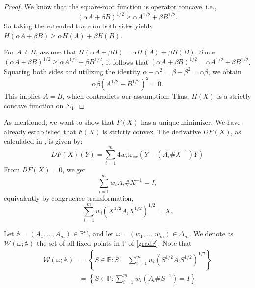 \documentclass[12pt,reqno]{amsart}
\begin{document}
\begin{proof}
We know that the square-root function is operator concave, i.e.,
\begin{displaymath}
(\alpha A + \beta B)^{1/2} \geq \alpha A^{1/2} + \beta B^{1/2}.
\end{displaymath}
So taking the extended trace on both sides yields $H(\alpha A + \beta B) \geq \alpha H(A) + \beta H(B)$.

For $A \neq B$, assume that $H(\alpha A + \beta B) = \alpha H(A) + \beta H(B).$
Since $(\alpha A + \beta B)^{1/2} \geq \alpha A^{1/2} + \beta B^{1/2}$, it follows that $(\alpha A + \beta B)^{1/2} = \alpha A^{1/2} + \beta B^{1/2}$.
Squaring both sides and utilizing the identity $\alpha - \alpha^2 = \beta - \beta^2 = \alpha \beta$, we obtain
\begin{displaymath}
\alpha \beta (A^{1/2} - B^{1/2})^{2} = 0.
\end{displaymath}
This implies $A = B$, which contradicts our assumption. Thus, $H(X)$ is a strictly concave function on $\Sigma_1$.
\end{proof}

As mentioned, we want to show that $F(X)$ has a unique minimizer. We have already established that $F(X)$ is strictly convex. The derivative $DF(X)$, as calculated  in \cite{BJL}, is given by:
\begin{displaymath}
D F(X)(Y) = \sum_{i=1}^{m} 4 w_i \mathrm{tr}_{ex} (Y - (A_i \# X^{-1}) Y)
\end{displaymath}
From $D F(X) = 0$, we get
\begin{equation*}
\sum_{i=1}^{m} w_i A_i \# X^{-1} = I,
\end{equation*}
equivalently by congruence transformation,
\begin{equation} \label{gradF}
\sum_{i=1}^{m} w_{i} (X^{1/2} A_{i} X^{1/2})^{1/2} = X.
\end{equation}



Let $\mathbb{A} = (A_{1}, \dots, A_{m}) \in \mathbb{P}^{m}$, and let $\omega = (w_{1}, \dots, w_{m}) \in \Delta_{m}$. We denote as $\mathcal{W}(\omega; \mathbb{A})$ the set of all fixed points in $\mathbb{P}$ of \eqref{gradF}.
Note that
\begin{displaymath}
\begin{split}
\mathcal{W}(\omega; \mathbb{A}) & = \left\{ S \in \mathbb{P} : S = \sum_{i=1}^{m} w_{i} ( S^{1/2} A_{i} S^{1/2} )^{1/2} \right\} \\
& = \left\{ S \in \mathbb{P} : \sum_{i=1}^{m} w_{i} (A_{i} \# S^{-1}) = I \right\}
\end{split}
\end{displaymath}
\end{document}
